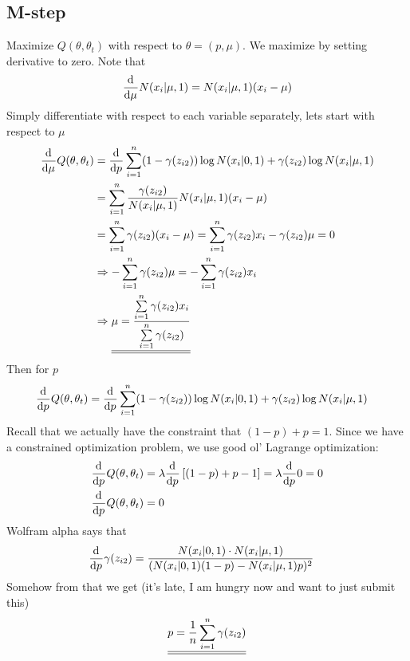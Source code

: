 \documentclass[12pt]{article}
\begin{document}
    \subsection*{M-step}
        Maximize $Q(\theta, \theta_t)$ with respect to $\theta = (p, \mu)$. We maximize by setting derivative to zero. Note that 
        \begin{align*}
            \frac{\text{d}^{ } }{\text{d} \mu^{ }} N(x_i|\mu, 1) = N(x_i|\mu,1)(x_i-\mu) 
        \end{align*}
        Simply differentiate with respect to each variable separately, lets start with respect to $\mu$ 
        \begin{align}
            \frac{\text{d}^{ } }{\text{d} \mu^{ }} Q(\theta, \theta_t) &= \frac{\text{d}^{ } }{\text{d} p^{ }} \sum\limits_{i=1}^{n} (1-\gamma({z_{i2}})) \log N(x_i|0,1) + \gamma({z_{i2}}) \log N(x_i|\mu,1) \\
            &= \sum\limits_{i=1}^{n} \frac{\gamma({z_{i2}})}{N(x_i|\mu,1)} N(x_i|\mu,1)(x_i-\mu) \\ 
            &= \sum\limits_{i=1}^{n} \gamma({z_{i2}})(x_i-\mu) = \sum\limits_{i=1}^{n} \gamma({z_{i2}})x_i - \gamma({z_{i2}}) \mu = 0 \\
            &\Rightarrow -\sum\limits_{i=1}^{n} \gamma({z_{i2}})\mu = -\sum\limits_{i=1}^{n} \gamma({z_{i2}})x_i \\
            &\Rightarrow \underline{\underline{\mu = \frac{\sum\limits_{i=1}^{n} \gamma({z_{i2}})x_i}{\sum\limits_{i=1}^{n} \gamma({z_{i2}})}}} 
        \end{align}
        Then for $p$
        \begin{align*}
            \frac{\text{d}^{ } }{\text{d} p^{ }} Q(\theta, \theta_t) &= \frac{\text{d}^{ } }{\text{d} p^{ }} \sum\limits_{i=1}^{n} (1-\gamma({z_{i2}})) \log N(x_i|0,1) + \gamma({z_{i2}}) \log N(x_i|\mu,1)
        \end{align*}
        Recall that we actually have the constraint that $(1-p)+p = 1$. Since we have a constrained optimization problem, we use good ol' Lagrange optimization:
        \begin{align}
            \frac{\text{d}^{ } }{\text{d} p^{ }} Q(\theta, \theta_t) &= \lambda \frac{\text{d}^{ } }{\text{d} p^{ }} \left[(1-p)+p-1\right] = \lambda \frac{\text{d}^{ } }{\text{d} p^{ }} 0 = 0 \\
            \frac{\text{d}^{ } }{\text{d} p^{ }} Q(\theta, \theta_t) &= 0
        \end{align}
        Wolfram alpha says that 
        \begin{align*}
            \frac{\text{d}^{ } }{\text{d} p^{ }} \gamma({z_{i2}}) &= \frac{N(x_i|0,1) \cdot N(x_i|\mu,1)}{(N(x_i|0,1)(1-p) - N(x_i|\mu, 1)p)^2} 
        \end{align*}
        Somehow from that we get (it's late, I am hungry now and want to just submit this)
        \begin{align}
            \underline{\underline{p = \frac{1}{n} \sum\limits_{i=1}^{n} \gamma({z_{i2}})}}
        \end{align}
\end{document}
